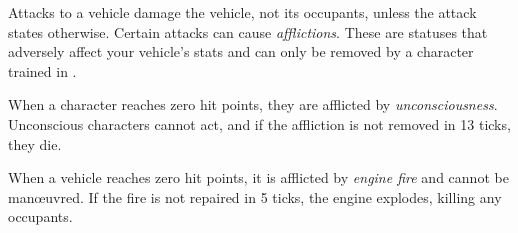
Attacks to a vehicle damage the vehicle, not its occupants, unless the attack states otherwise. Certain attacks can cause \emph{afflictions}. These are statuses that adversely affect your vehicle's stats and can only be removed by a character trained in .

When a character reaches zero hit points, they are afflicted by \emph{unconsciousness}. Unconscious characters cannot act, and if the affliction is not removed in 13 ticks, they die.

When a vehicle reaches zero hit points, it is afflicted by \emph{engine fire} and cannot be man\oe{}uvred. If the fire is not repaired in 5 ticks, the engine explodes, killing any occupants.
